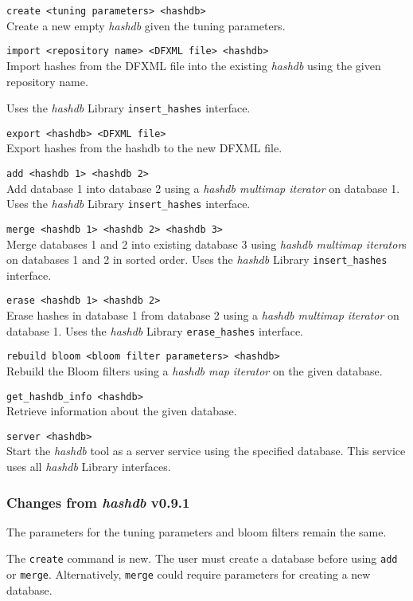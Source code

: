 \documentclass[12pt,twoside]{article}
\newcommand{\hdb}{\emph{hashdb}\xspace}
\begin{document}
\begin{compactitem}
\item \texttt{create <tuning parameters> <hashdb>} \\
Create a new empty \hdb given the tuning parameters.
\item \texttt{import <repository name> <DFXML file> <hashdb>} \\
Import hashes from the DFXML file into the existing \hdb
using the given repository name.

Uses the \hdb Library \texttt{insert\_hashes} interface.
\item \texttt{export <hashdb> <DFXML file>} \\
Export hashes from the hashdb to the new DFXML file.
\item \texttt{add <hashdb 1> <hashdb 2>} \\
Add database 1 into database 2
using a \emph{hashdb multimap iterator} on database 1.
Uses the \hdb Library \texttt{insert\_hashes} interface.
\item \texttt{merge <hashdb 1> <hashdb 2> <hashdb 3>} \\
Merge databases 1 and 2 into existing database 3
using \emph{hashdb multimap iterator}s on databases 1 and 2 in sorted order.
Uses the \hdb Library \texttt{insert\_hashes} interface.
\item \texttt{erase <hashdb 1> <hashdb 2>} \\
Erase hashes in database 1 from database 2
using a \emph{hashdb multimap iterator} on database 1.
Uses the \hdb Library \texttt{erase\_hashes} interface.
\item \texttt{rebuild bloom <bloom filter parameters> <hashdb>} \\
Rebuild the Bloom filters
using a \emph{hashdb map iterator} on the given database.
\item \texttt{get\_hashdb\_info <hashdb>} \\
Retrieve information about the given database.
\item \texttt{server <hashdb>} \\
Start the \hdb tool as a server service using the specified database.
This service uses all \hdb Library interfaces.
\end{compactitem}

\subsubsection{Changes from \hdb v0.9.1}
\begin{compactitem}
\item The parameters for the tuning parameters and bloom filters
remain the same.
\item The \texttt{create} command is new.
The user must create a database before using \texttt{add} or \texttt{merge}.
Alternatively, \texttt{merge} could require parameters for creating
a new database.
\end{compactitem}
\end{document}
